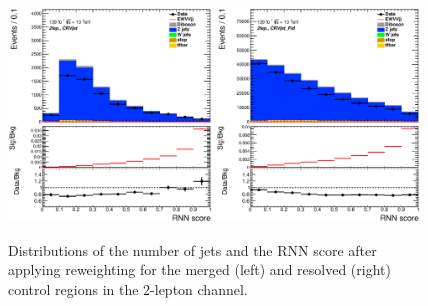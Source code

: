 \begin{figure}[ht]
    \includegraphics[width=0.48\textwidth]{figures/2lep/reweighting/after_reweighting/C_0ptag1pfat0pjet_0ptv_CRVjet_RNNScoreMerged_Lin.eps}
    \includegraphics[width=0.48\textwidth]{figures/2lep/reweighting/after_reweighting/C_0ptag2pjet_0ptv_CRVjet_Fid_RNNScoreResolved_Lin.eps}
    \caption{ Distributions of the number of jets and the RNN score after applying reweighting for the merged (left) and resolved (right) control regions in the 2-lepton channel.}
    \label{fig:after_rw}
\end{figure}
%

